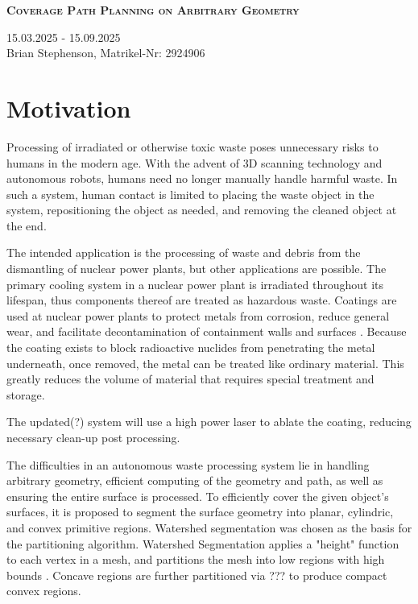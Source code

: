 \documentclass[a4paper, 10pt]{article}
\begin{document}
	
\begin{center}
	\fontsize{24pt}{10pt}\selectfont
	\textsc{\textbf{Coverage Path Planning on Arbitrary Geometry}}
\end{center}
\begin{center}
	15.03.2025 - 15.09.2025 \\
	Brian Stephenson, Matrikel-Nr: 2924906
\end{center}

\section*{Motivation}
Processing of irradiated or otherwise toxic waste poses unnecessary risks to humans in the modern age.
With the advent of 3D scanning technology and autonomous robots, humans need no longer manually handle harmful waste.
In such a system, human contact is limited to placing the waste object in the system, repositioning the object as needed, and removing the cleaned object at the end.

The intended application is the processing of waste and debris from the dismantling of nuclear power plants, but other applications are possible.
The primary cooling system in a nuclear power plant is irradiated throughout its lifespan, thus components thereof are treated as hazardous waste.
Coatings are used at nuclear power plants to protect metals from corrosion, reduce general wear, and facilitate decontamination of containment walls and surfaces \cite{NRC_coatings}.
Because the coating exists to block radioactive nuclides from penetrating the metal underneath, once removed, the metal can be treated like ordinary material.
This greatly reduces the volume of material that requires special treatment and storage.

The updated(?) system will use a high power laser to ablate the coating, reducing necessary clean-up post processing.

The difficulties in an autonomous waste processing system lie in handling arbitrary geometry, efficient computing of the geometry and path, as well as ensuring the entire surface is processed.
To efficiently cover the given object's surfaces, it is proposed to segment the surface geometry into planar, cylindric, and convex primitive regions.
Watershed segmentation was chosen as the basis for the partitioning algorithm.
Watershed Segmentation applies a "height" function to each vertex in a mesh, and partitions the mesh into low regions with high bounds \cite{Watershed, Hier_seg_autobody_painting}.
Concave regions are further partitioned via ??? to produce compact convex regions.
\end{document}
